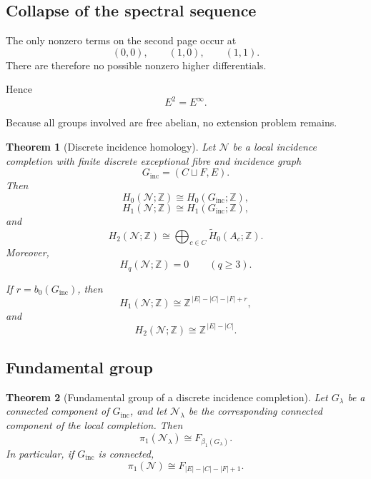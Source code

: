 \documentclass[11pt]{article}
\theoremstyle{plain}
\newtheorem{theorem}{Theorem}[section]
\theoremstyle{definition}
\begin{document}
\subsection{Collapse of the spectral sequence}
\label{subsec:MV-collapse}

The only nonzero terms on the second page occur at
\[
(0,0),\qquad
(1,0),\qquad
(1,1).
\]
There are therefore no possible nonzero higher differentials.

Hence
\[
E^2=E^\infty.
\]

Because all groups involved are free abelian, no extension problem
remains.


\begin{theorem}[Discrete incidence homology]
\label{thm:discrete-incidence-homology}
Let $\mathcal N$ be a local incidence completion with finite discrete
exceptional fibre and incidence graph
\[
G_{\mathrm{inc}}=(C\sqcup F,E).
\]
Then
\[
H_0(\mathcal N;\mathbb Z)
\cong
H_0(G_{\mathrm{inc}};\mathbb Z),
\]
\[
H_1(\mathcal N;\mathbb Z)
\cong
H_1(G_{\mathrm{inc}};\mathbb Z),
\]
and
\[
H_2(\mathcal N;\mathbb Z)
\cong
\bigoplus_{c\in C}
\widetilde H_0(A_c;\mathbb Z).
\]
Moreover,
\[
H_q(\mathcal N;\mathbb Z)=0
\qquad(q\geq3).
\]

If $r=b_0(G_{\mathrm{inc}})$, then
\[
H_1(\mathcal N;\mathbb Z)
\cong
\mathbb Z^{\,|E|-|C|-|F|+r},
\]
and
\[
H_2(\mathcal N;\mathbb Z)
\cong
\mathbb Z^{\,|E|-|C|}.
\]
\end{theorem}


\subsection{Fundamental group}
\label{subsec:incidence-pi1}

\begin{theorem}[Fundamental group of a discrete incidence completion]
\label{thm:incidence-fundamental-group}
Let $G_\lambda$ be a connected component of $G_{\mathrm{inc}}$, and let
$\mathcal N_\lambda$ be the corresponding connected component of the local completion.  Then
\[
\pi_1(\mathcal N_\lambda)\cong F_{\beta_1(G_\lambda)}.
\]
In particular, if $G_{\mathrm{inc}}$ is connected,
\[
\pi_1(\mathcal N)\cong F_{|E|-|C|-|F|+1}.
\]
\end{theorem}
\end{document}
